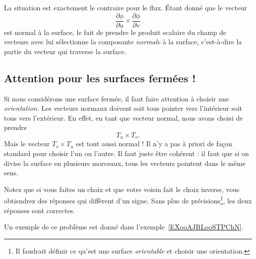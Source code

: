 La situation est exactement le contraire pour le flux. Étant donné que le vecteur
\begin{equation}
	\frac{ \partial \phi }{ \partial u }\times\frac{ \partial \phi }{ \partial v }
\end{equation}
est normal à la surface, le fait de prendre le produit scalaire du champ de vecteurs avec lui sélectionne la composante \emph{normale} à la surface, c'est-à-dire la partie du vecteur qui traverse la surface.

\subsection{Attention pour les surfaces fermées !}

Si nous considérons une surface fermée, il faut faire attention à choisir une \emph{orientation}. Les vecteurs normaux doivent soit tous pointer vers l'intérieur soit tous vers l'extérieur. En effet, en tant que vecteur normal, nous avons choisi de prendre
\begin{equation}
	T_u\times T_v.
\end{equation}
Mais le vecteur $T_v\times T_u$ est tout aussi normal ! Il n'y a pas à priori de façon standard pour choisir l'un ou l'autre. Il faut juste être cohérent : il faut que si on divise la surface en plusieurs morceaux, tous les vecteurs pointent dans le même sens.

Notez que si vous faites un choix et que votre voisin fait le choix inverse, vous obtiendrez des réponses qui diffèrent d'un signe. Sans plus de précisions\footnote{Il faudrait définir ce qu'est une surface \emph{orientable} et choisir une orientation.}, les deux réponses sont correctes.

Un exemple de ce problème est donné dans l'exemple~\ref{EXooAJRLooSTPChN}.

